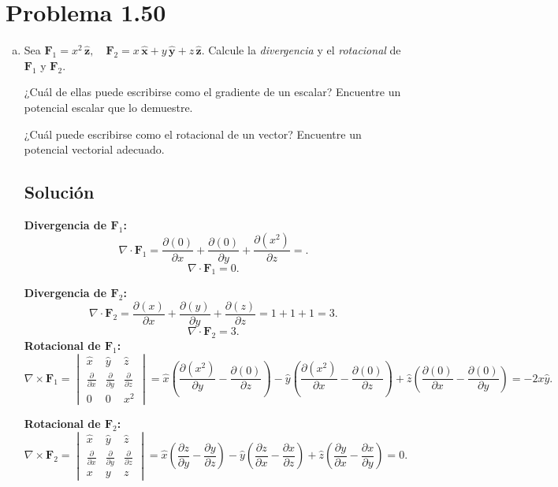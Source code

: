 \documentclass[12pt]{article}
\begin{document}
\section*{\color{blue} Problema 1.50}
\begin{enumerate}[(a)]
    \item  
    Sea \(
    \mathbf{F}_1 = x^2 \,\hat{\mathbf{z}}, 
    \quad
    \mathbf{F}_2 = x\,\hat{\mathbf{x}} + y\,\hat{\mathbf{y}} + z\,\hat{\mathbf{z}}.
    \)
    Calcule la \emph{divergencia} y el \emph{rotacional} de \(\mathbf{F}_1\) y \(\mathbf{F}_2\). 
    
    \noindent
    ¿Cuál de ellas puede escribirse como el gradiente de un escalar? Encuentre un potencial escalar que lo demuestre. 
    
    \noindent
    ¿Cuál puede escribirse como el rotacional de un vector? Encuentre un potencial vectorial adecuado.
    \subsection*{Solución}


    \textbf{Divergencia de \(\mathbf{F} _1\):}
    \[
    \nabla \cdot \mathbf{F} _1 = \frac{\partial (0)}{\partial x} + \frac{\partial (0)}{\partial y} + \frac{\partial (x^2)}{\partial z} = .
    \]
    \[
    \boxed{\nabla \cdot \mathbf{F} _1 = 0.}
    \]

    \textbf{Divergencia de \(\mathbf{F} _2\):}
    \[
    \nabla \cdot \mathbf{F} _2 = \frac{\partial (x)}{\partial x} + \frac{\partial (y)}{\partial y} + \frac{\partial (z)}{\partial z} = 1 + 1 + 1 = 3.
    \]
    \[
    \boxed{\nabla \cdot \mathbf{F} _2 = 3.}
    \]
    \textbf{Rotacional de \(\mathbf{F} _1\):}
    \[
    \nabla \times \mathbf{F} _1 = \begin{vmatrix}
    \hat{x} & \hat{y} & \hat{z} \\
    \frac{\partial}{\partial x} & \frac{\partial}{\partial y} & \frac{\partial}{\partial z} \\
    0 & 0 & x^2
    \end{vmatrix} = \hat{x} \left(\frac{\partial (x^2)}{\partial y} - \frac{\partial (0)}{\partial z}\right) - \hat{y} \left(\frac{\partial (x^2)}{\partial x} - \frac{\partial (0)}{\partial z}\right) + \hat{z} \left(\frac{\partial (0)}{\partial x} - \frac{\partial (0)}{\partial y}\right) = \boxed{-2x \hat{y}.}
    \]


    \textbf{Rotacional de \(\mathbf{F} _2\):}
    \[
    \nabla \times \mathbf{F} _2 = \begin{vmatrix}
    \hat{x} & \hat{y} & \hat{z} \\
    \frac{\partial}{\partial x} & \frac{\partial}{\partial y} & \frac{\partial}{\partial z} \\
    x & y & z
    \end{vmatrix} = \hat{x} \left(\frac{\partial z}{\partial y} - \frac{\partial y}{\partial z}\right) - \hat{y} \left(\frac{\partial z}{\partial x} - \frac{\partial x}{\partial z}\right) + \hat{z} \left(\frac{\partial y}{\partial x} - \frac{\partial x}{\partial y}\right) = \boxed{0}.
    \]


\end{enumerate}
\end{document}
